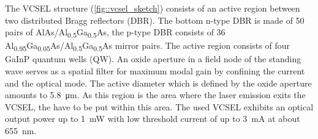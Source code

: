 	The VCSEL structure (\cref{fig::vcsel_sketch}) consists of an active region between two distributed Bragg reflectors (DBR). 
	The bottom n-type DBR is made of 50 pairs of AlAs/Al\textsubscript{0.5}Ga\textsubscript{0.5}As, the p-type DBR consists of 36 Al\textsubscript{0.95}Ga\textsubscript{0.05}As/Al\textsubscript{0.5}Ga\textsubscript{0.5}As mirror pairs. 
	The active region consists of four GaInP quantum wells (QW). 
	An oxide aperture in a field node of the standing wave serves as a spatial filter for maximum modal gain by confining the current and the optical mode.
	The active diameter which is defined by the oxide aperture amounts to \SI{5.8}{\micro\meter}.
	As this region is the area where the laser emission exits the VCSEL, the \nds have to be put within this area.
	The used VCSEL exhibits an optical output power up to \SI{1}{\milli\watt} with low threshold current of up to \SI{3}{\milli\ampere} at about \SI{655}{nm}. 

